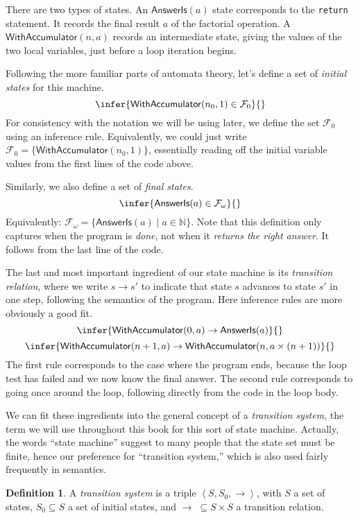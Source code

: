 \documentclass{amsbook}
\theoremstyle{definition}
\newtheorem{definition}[theorem]{Definition}
\theoremstyle{remark}
\numberwithin{section}{chapter}
\numberwithin{equation}{chapter}
\begin{document}
There are two types of states.
An $\mathsf{AnswerIs}(a)$ state corresponds to the \texttt{return} statement.
It records the final result $a$ of the factorial operation.
A $\mathsf{WithAccumulator}(n, a)$ records an intermediate state, giving the values of the two local variables, just before a loop iteration begins.

Following the more familiar parts of automata theory, let's define a set of \emph{initial states} for this machine.
$$\infer{\mathsf{WithAccumulator}(n_0, 1) \in \mathcal F_0}{}$$
For consistency with the notation we will be using later, we define the set $\mathcal F_0$ using an inference rule.
Equivalently, we could just write $\mathcal F_0 = \{\mathsf{WithAccumulator}(n_0, 1)\}$, essentially reading off the initial variable values from the first lines of the code above.

Similarly, we also define a set of \emph{final states}.
$$\infer{\mathsf{AnswerIs}(a) \in \mathcal F_\omega}{}$$
Equivalently: $\mathcal F_\omega = \{\mathsf{AnswerIs}(a) \mid a \in \mathbb N\}$.
Note that this definition only captures when the program is \emph{done}, not when it \emph{returns the right answer}.
It follows from the last line of the code.

The last and most important ingredient of our state machine is its \emph{transition relation}, where we write $s \to s'$ to indicate that state $s$ advances to state $s'$ in one step, following the semantics of the program.
Here inference rules are more obviously a good fit.
$$\infer{\mathsf{WithAccumulator}(0, a) \to \mathsf{AnswerIs}(a)}{}$$
$$\infer{\mathsf{WithAccumulator}(n+1, a) \to \mathsf{WithAccumulator}(n, a \times (n+1))}{}$$
The first rule corresponds to the case where the program ends, because the loop test has failed and we now know the final answer.
The second rule corresponds to going once around the loop, following directly from the code in the loop body.

We can fit these ingredients into the general concept of a \emph{transition system}, the term we will use throughout this book for this sort of state machine.
Actually, the words ``state machine'' suggest to many people that the state set must be finite, hence our preference for ``transition system,'' which is also used fairly frequently in semantics.

\newcommand{\angled}[1]{{\left \langle #1 \right \rangle}}

\begin{definition}
  A \emph{transition system} is a triple $\angled{S, S_0, \to}$, with $S$ a set of states, $S_0 \subseteq S$ a set of initial states, and $\to \; \subseteq S \times S$ a transition relation.
\end{definition}
\end{document}
